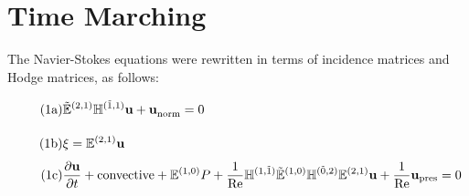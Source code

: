\section{Time Marching}

The Navier-Stokes equations were rewritten in terms of incidence matrices and Hodge matrices, as follows:
\begin{align}
    \stepcounter{equation}
    \tag{{\theequation}a}
    \label{eq:timeContinuity}
    &\tilde{\mathbb{E}}^{(2,1)} \mathbb{H}^{(\tilde{1},1)} \mathbf{u}  + \mathbf{u}^{}_{\text{norm}} = 0 \vphantom{\frac{\partial^{(1)}}{\partial}} \\
    \tag{{\theequation}b}
    \label{eq:timeVorticity}
    &\xi = \mathbb{E}^{(2,1)} \mathbf{u} \vphantom{\frac{\partial^{(1)}}{\partial}} \\
    \tag{{\theequation}c}
    \label{eq:timeMomentum}
    &\frac{\partial \mathbf{u}}{\partial t} + \text{convective} + \mathbb{E}^{(1,0)} P + \frac{1}{\text{Re}} \mathbb{H}^{(1,\tilde{1})} \tilde{\mathbb{E}}^{(1,0)} \mathbb{H}^{(\tilde{0},2)} \mathbb{E}^{(2,1)} \mathbf{u} + \frac{1}{\text{Re}} \mathbf{u}_{\text{pres}} = 0
\end{align}

